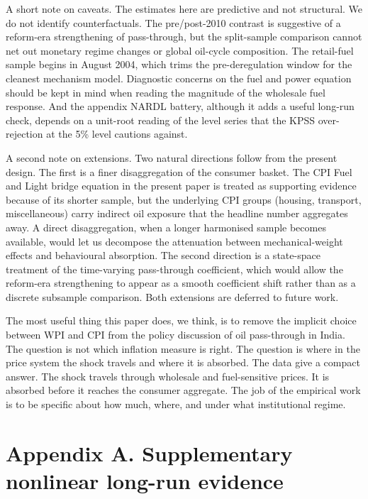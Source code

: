 \documentclass[11pt,a4paper]{article}
\begin{document}
A short note on caveats. The estimates here are predictive and not structural. We do not identify counterfactuals. The pre/post-2010 contrast is suggestive of a reform-era strengthening of pass-through, but the split-sample comparison cannot net out monetary regime changes or global oil-cycle composition. The retail-fuel sample begins in August 2004, which trims the pre-deregulation window for the cleanest mechanism model. Diagnostic concerns on the fuel and power equation should be kept in mind when reading the magnitude of the wholesale fuel response. And the appendix NARDL battery, although it adds a useful long-run check, depends on a unit-root reading of the level series that the KPSS over-rejection at the 5\% level cautions against.

A second note on extensions. Two natural directions follow from the present design. The first is a finer disaggregation of the consumer basket. The CPI Fuel and Light bridge equation in the present paper is treated as supporting evidence because of its shorter sample, but the underlying CPI groups (housing, transport, miscellaneous) carry indirect oil exposure that the headline number aggregates away. A direct disaggregation, when a longer harmonised sample becomes available, would let us decompose the attenuation between mechanical-weight effects and behavioural absorption. The second direction is a state-space treatment of the time-varying pass-through coefficient, which would allow the reform-era strengthening to appear as a smooth coefficient shift rather than as a discrete subsample comparison. Both extensions are deferred to future work.

The most useful thing this paper does, we think, is to remove the implicit choice between WPI and CPI from the policy discussion of oil pass-through in India. The question is not which inflation measure is right. The question is where in the price system the shock travels and where it is absorbed. The data give a compact answer. The shock travels through wholesale and fuel-sensitive prices. It is absorbed before it reaches the consumer aggregate. The job of the empirical work is to be specific about how much, where, and under what institutional regime.



\appendix

\section*{Appendix A. Supplementary nonlinear long-run evidence}
\end{document}

